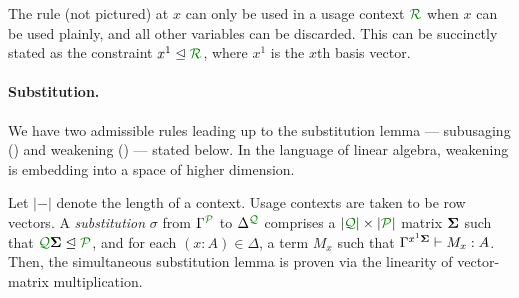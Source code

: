 \documentclass[a4paper]{easychair}
\begin{document}
\vspace{-0.3cm}


The  rule (not pictured) at $x$ can only be used in a usage context
$\resctx R$ when $x$ can be used plainly, and all other variables can be
discarded.
This can be succinctly stated as the constraint $x^1 \subres \resctx R$,
where $x^1$ is the $x$th basis vector.

\vspace{-0.1cm}

\paragraph{Substitution.}

We have two admissible rules leading up to the substitution lemma --- subusaging
() and weakening () --- stated below.
In the language of linear algebra, weakening is embedding into a space of higher
dimension.

Let $|-|$ denote the length of a context.
Usage contexts are taken to be row vectors.
A \emph{substitution} $\sigma$ from $\ctx{\Gamma}{P}$ to $\ctx{\Delta}{Q}$
comprises a $|\resctx Q| \times |\resctx P|$ matrix $\mathbf{\Sigma}$ such that
$\resctx Q \mat \Sigma \subres \resctx P$, and for each $(x:A) \in \Delta$, a
term $M_x$ such that $\Gamma^{x^1 \mathbf{\Sigma}} \vdash M_x : A$.
Then, the simultaneous substitution lemma is proven via the linearity of
vector-matrix multiplication.

\vspace{-0.6cm}

\end{document}
